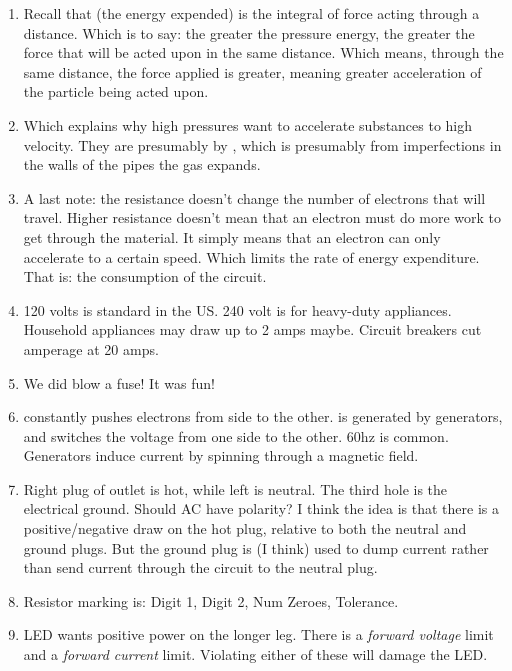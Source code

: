 \documentclass[11pt, oneside]{amsart}
\begin{document}
\begin{enumerate}
  \item Recall that  (the energy expended) is the integral
  of force acting through a distance. Which is to say: the greater the
  pressure energy, the greater the force that will be acted upon in the
  same distance.  Which means, through the same distance, the force
  applied is greater, meaning greater acceleration of the particle being
  acted upon.

  \item Which explains why high pressures want to accelerate substances
  to high velocity. They are  presumably by
  , which is presumably from imperfections in the
  walls of the pipes the gas expands.

  \item A last note: the resistance doesn't change the number of
  electrons that will travel. Higher resistance doesn't mean that an
  electron must do more work to get through the material. It simply
  means that an electron can only accelerate to a certain speed. Which
  limits the rate of energy expenditure. That is: the 
  consumption of the circuit.

  \item 120 volts is standard in the US. 240 volt is for heavy-duty
  appliances. Household appliances may draw up to 2 amps maybe. Circuit
  breakers cut amperage at 20 amps.

  \item We did blow a fuse! It was fun!

  \item {} constantly pushes electrons from side to
  the other.  is generated by generators,
  and switches the voltage from one side to the other. 60hz is common.
  Generators induce current by spinning through a magnetic field.

  \item Right plug of outlet is hot, while left is neutral. The third
  hole is the electrical ground. Should AC have polarity? I think the
  idea is that there is a positive/negative draw on the hot plug,
  relative to both the neutral and ground plugs. But the ground plug is
  (I think) used to dump current rather than send current through the
  circuit to the neutral plug.

  \item Resistor marking is: Digit 1, Digit 2, Num Zeroes, Tolerance.

  \item LED wants positive power on the longer leg. There is a
  \emph{forward voltage} limit and a \emph{forward current} limit.
  Violating either of these will damage the LED.


\end{enumerate}
\end{document}
